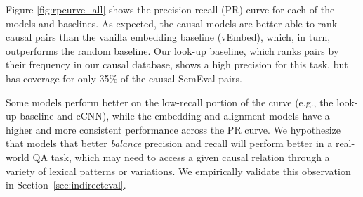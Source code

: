 Figure \ref{fig:rpcurve_all} shows the precision-recall (PR) curve for each of the models and baselines. 
As expected, the causal models are better able to rank causal pairs than the vanilla embedding baseline (vEmbed), which, in turn, outperforms the random baseline.  Our look-up baseline, which ranks pairs by their frequency in our causal database, shows a high precision for this task, but has coverage for only 35\% of the causal SemEval pairs.
%

Some models perform better on the low-recall portion of the curve (e.g., the look-up baseline and cCNN), while the embedding and alignment models have a higher and more consistent performance across the PR curve. We hypothesize that models that better \emph{balance} precision and recall will perform better in a real-world QA task, which may need to access a given causal relation through a variety of lexical patterns or variations. We empirically validate this observation in Section~\ref{sec:indirecteval}.









